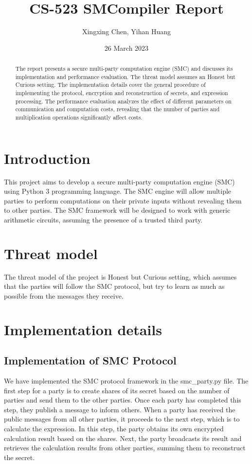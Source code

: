 \documentclass[10pt,conference,compsocconf]{IEEEtran}
\title{CS-523 SMCompiler Report}
\author{Xingxing Chen, Yihan Huang}
\date{26 March 2023}
\begin{document}
\maketitle

\begin{abstract}
The report presents a secure multi-party computation engine (SMC) and discusses its implementation and performance evaluation. The threat model assumes an Honest but Curious setting. The implementation details cover the general procedure of implementing the protocol, encryption and reconstruction of secrets, and expression processing. The performance evaluation analyzes the effect of different parameters on communication and computation costs, revealing that the number of parties and multiplication operations significantly affect costs.
\end{abstract}

\section{Introduction}
This project aims to develop a secure multi-party computation engine (SMC) using Python 3 programming language. The SMC engine will allow multiple parties to perform computations on their private inputs without revealing them to other parties. The SMC framework will be designed to work with generic arithmetic circuits, assuming the presence of a trusted third party.

\section{Threat model}
The threat model of the project is Honest but Curious setting, which assumes that the parties will follow the SMC protocol, but try to learn as much as possible from the messages they receive.

\section{Implementation details}
\subsection{Implementation of SMC Protocol}
We have implemented the SMC protocol framework in the smc\_party.py file. The first step for a party is to create shares of its secret based on the number of parties and send them to the other parties. Once each party has completed this step, they publish a message to inform others. When a party has received the public messages from all other parties, it proceeds to the next step, which is to calculate the expression. In this step, the party obtains its own encrypted calculation result based on the shares. Next, the party broadcasts its result and retrieves the calculation results from other parties, summing them to reconstruct the secret.
\end{document}
